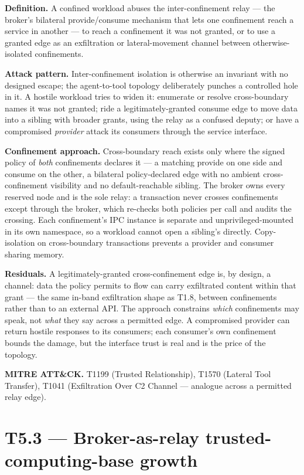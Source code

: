 \textbf{Definition.} A confined workload abuses the inter-confinement
relay --- the broker's bilateral provide/consume mechanism that lets one
confinement reach a service in another --- to reach a confinement it was
not granted, or to use a granted edge as an exfiltration or
lateral-movement channel between otherwise-isolated confinements.

\textbf{Attack pattern.} Inter-confinement isolation is otherwise an
invariant with no designed escape; the agent-to-tool topology
deliberately punches a controlled hole in it. A hostile workload tries
to widen it: enumerate or resolve cross-boundary names it was not
granted; ride a legitimately-granted consume edge to move data into a
sibling with broader grants, using the relay as a confused deputy; or
have a compromised \emph{provider} attack its consumers through the
service interface.

\textbf{Confinement approach.} Cross-boundary reach exists only where
the signed policy of \emph{both} confinements declares it --- a matching
provide on one side and consume on the other, a bilateral
policy-declared edge with no ambient cross-confinement visibility and no
default-reachable sibling. The broker owns every reserved node and is
the sole relay: a transaction never crosses confinements except through
the broker, which re-checks both policies per call and audits the
crossing. Each confinement's IPC instance is separate and
unprivileged-mounted in its own namespace, so a workload cannot open a
sibling's directly. Copy-isolation on cross-boundary transactions
prevents a provider and consumer sharing memory.

\textbf{Residuals.} A legitimately-granted cross-confinement edge is, by
design, a channel: data the policy permits to flow can carry exfiltrated
content within that grant --- the same in-band exfiltration shape as
T1.8, between confinements rather than to an external API. The approach
constrains \emph{which} confinements may speak, not \emph{what} they say
across a permitted edge. A compromised provider can return hostile
responses to its consumers; each consumer's own confinement bounds the
damage, but the interface trust is real and is the price of the
topology.

\textbf{MITRE ATT\&CK.} T1199 (Trusted Relationship), T1570 (Lateral
Tool Transfer), T1041 (Exfiltration Over C2 Channel --- analogue across
a permitted relay edge).

\hypertarget{t5.3-broker-as-relay-trusted-computing-base-growth}{%
\section{T5.3 --- Broker-as-relay trusted-computing-base
growth}\label{t5.3-broker-as-relay-trusted-computing-base-growth}}

